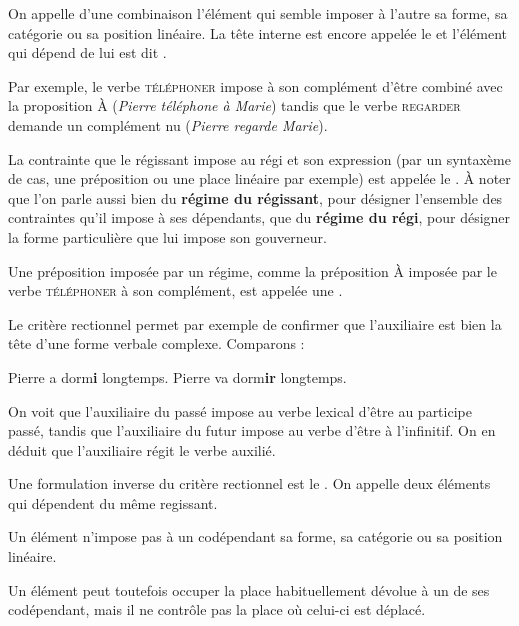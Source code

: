 {On appelle  d’une combinaison l’élément qui semble imposer à l’autre sa forme, sa catégorie ou sa position linéaire. La tête interne est encore appelée le  et l’élément qui dépend de lui est dit .}

Par exemple, le verbe \textsc{téléphoner} impose à son complément d’être combiné avec la proposition À (\textit{Pierre téléphone à Marie}) tandis que le verbe \textsc{regarder} demande un complément nu (\textit{Pierre regarde Marie}).

{La contrainte que le régissant impose au régi et son expression (par un syntaxème de cas, une préposition ou une place linéaire par exemple) est appelée le . À noter que l’on parle aussi bien du \textbf{régime du régissant}, pour désigner l’ensemble des contraintes qu’il impose à ses dépendants, que du \textbf{régime du régi}, pour désigner la forme particulière que lui impose son gouverneur.}

Une préposition imposée par un régime, comme la préposition À imposée par le verbe \textsc{téléphoner} à son complément, est appelée une .

Le critère rectionnel permet par exemple de confirmer que l’auxiliaire est bien la tête d’une forme verbale complexe. Comparons :

\ea
  \ea Pierre a dorm\textbf{i}  longtemps.
  \ex Pierre va dorm\textbf{ir}  longtemps.
  \z
\z

On voit que l’auxiliaire du passé impose au verbe lexical d’être au participe passé, tandis que l’auxiliaire du futur impose au verbe d’être à l’infinitif. On en déduit que l’auxiliaire régit le verbe auxilié.

Une formulation inverse du critère rectionnel est le . On appelle  deux éléments qui dépendent du même regissant.~

{Un élément n’impose pas à un codépendant sa forme, sa catégorie ou sa position linéaire.}

Un élément peut toutefois occuper la place habituellement dévolue à un de ses codépendant, mais il ne contrôle pas la place où celui-ci est déplacé.


